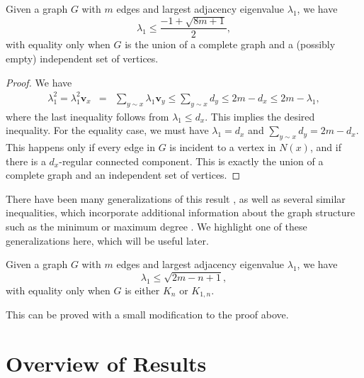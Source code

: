 \begin{theorem}
  Given a graph $G$ with $m$ edges and largest adjacency eigenvalue $\lambda_1$, we have
  \[ \lambda_1 \leq \frac{-1 + \sqrt{8m + 1}}{2} ,\]
  with equality only when $G$ is the union of a complete graph and a (possibly empty) independent set of vertices.
\end{theorem}
\begin{proof}
  We have
  \begin{eqnarray*}
    \lambda_1^2 = \lambda_1^2 \mathbf{v}_x & = & \sum_{y \sim x} \lambda_1 \mathbf{v}_y \leq \sum_{y \sim x} d_y \leq 2m - d_x \leq 2m - \lambda_1, 
  \end{eqnarray*}
  where the last inequality follows from $\lambda_1 \leq d_x$.  This implies the desired inequality.  For the equality case, we must have
  $\lambda_1 = d_x$ and $\sum_{y \sim x} d_y = 2m - d_x$.  This happens only if every edge in $G$ is incident to a vertex in $N(x)$,
  and if there is a $d_x$-regular connected component.  This is exactly the union of a complete graph and an independent set of vertices. 
  
\end{proof}


There have been many generalizations of this result \cite{Hong1988, HongEtAl2001, Nikiforov2002, DasKumar2004},
as well as several
similar inequalities, which incorporate additional information about the graph structure
such as the minimum or maximum degree \cite{FavaronMaheoSacle1993, BermanZhang2001, Nikiforov2006Walks}.  We highlight one of these generalizations here, which will be useful later.

\begin{theorem}
  Given a graph $G$ with $m$ edges and largest adjacency eigenvalue $\lambda_1$, we have
  \[ \lambda_1 \leq \sqrt{2m - n + 1} ,\]
  with equality only when $G$ is either $K_n$ or $K_{1,n}$.
\end{theorem}
This can be proved with a small modification to the proof above.  


\section{Overview of Results}

